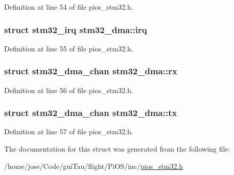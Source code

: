 Definition at line 54 of file pios\-\_\-stm32.\-h.

\hypertarget{structstm32__dma_ae18ccde217e150c9de5b55b43d110a9d}{
\subsubsection[{irq}]{\setlength{\rightskip}{0pt plus 5cm}struct {\bf stm32\-\_\-irq} stm32\-\_\-dma\-::irq}}\label{structstm32__dma_ae18ccde217e150c9de5b55b43d110a9d}


Definition at line 55 of file pios\-\_\-stm32.\-h.

\hypertarget{structstm32__dma_a967c78ffd2d021ac268f1d8c0a2c7e30}{
\subsubsection[{rx}]{\setlength{\rightskip}{0pt plus 5cm}struct {\bf stm32\-\_\-dma\-\_\-chan} stm32\-\_\-dma\-::rx}}\label{structstm32__dma_a967c78ffd2d021ac268f1d8c0a2c7e30}


Definition at line 56 of file pios\-\_\-stm32.\-h.

\hypertarget{structstm32__dma_a4ef0eab3e87fc579e24c36e51d31b88a}{
\subsubsection[{tx}]{\setlength{\rightskip}{0pt plus 5cm}struct {\bf stm32\-\_\-dma\-\_\-chan} stm32\-\_\-dma\-::tx}}\label{structstm32__dma_a4ef0eab3e87fc579e24c36e51d31b88a}


Definition at line 57 of file pios\-\_\-stm32.\-h.



The documentation for this struct was generated from the following file\-:\begin{DoxyCompactItemize}
\item 
/home/jose/\-Code/gui\-Tau/flight/\-Pi\-O\-S/inc/\hyperlink{pios__stm32_8h}{pios\-\_\-stm32.\-h}\end{DoxyCompactItemize}
